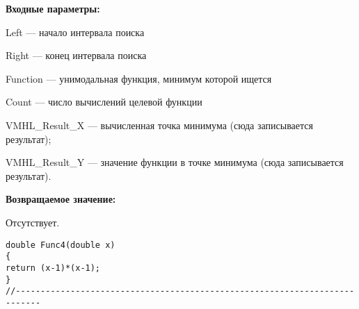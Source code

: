 \textbf{Входные параметры:}

 Left --- начало интервала поиска
 
Right --- конец интервала поиска
 
Function --- унимодальная функция, минимум которой ищется
 
Count --- число вычислений целевой функции
 
VMHL\_Result\_X --- вычисленная точка минимума (сюда записывается результат);
 
VMHL\_Result\_Y --- значение функции в точке минимума (сюда записывается результат).

\textbf{Возвращаемое значение:}
 
 Отсутствует.

\begin{lstlisting}[caption=Оптимизируемая функция]
double Func4(double x)
{
return (x-1)*(x-1);
}
//---------------------------------------------------------------------------
\end{lstlisting}